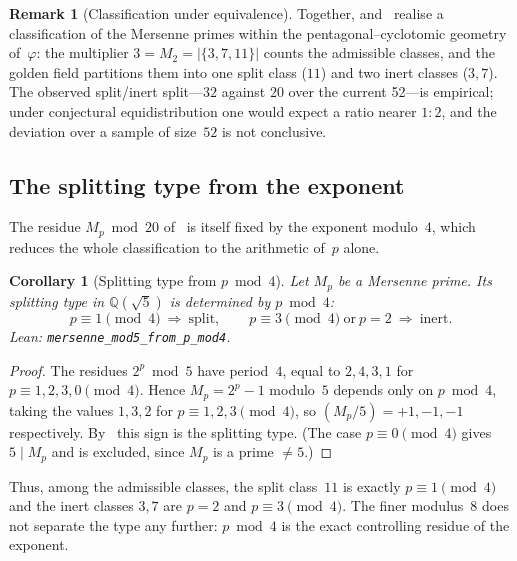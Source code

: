 \documentclass[11pt]{amsart}
\newtheorem{Corollary}[Theorem]{Corollary}
\theoremstyle{definition}
\newtheorem{Remark}[Theorem]{Remark}
\newcommand{\golden}{\varphi}
\newcommand{\Mp}{M_{p}}
\newcommand{\lean}[1]{\texttt{#1}}
\begin{document}
\begin{Remark}[Classification under equivalence]\label{rem:classification}
Together,  and~
realise a classification of the Mersenne primes within the
pentagonal--cyclotomic geometry of~$\golden$: the multiplier
$3=M_{2}=|\{3,7,11\}|$ counts the admissible classes, and the golden
field partitions them into one split class ($11$) and two inert classes
($3,7$).  The observed split/inert split---$32$ against $20$ over the
current 52---is empirical; under conjectural equidistribution one would
expect a ratio nearer $1:2$, and the deviation over a sample of size~$52$
is not conclusive.
\end{Remark}


\subsection{The splitting type from the exponent}
\label{ssec:fib-exponent}

The residue $\Mp\bmod20$ of~ is itself fixed by the
exponent modulo~$4$, which reduces the whole classification to the
arithmetic of~$p$ alone.

\begin{Corollary}[Splitting type from $p\bmod4$]\label{cor:split-from-p}
Let $\Mp$ be a Mersenne prime.  Its splitting type in $\mathbb{Q}(\sqrt5)$
is determined by $p\bmod4$:
\[
  p\equiv1\!\!\pmod4\ \Rightarrow\ \text{split},
  \qquad
  p\equiv3\!\!\pmod4\ \text{or}\ p=2\ \Rightarrow\ \text{inert}.
\]
  \emph{Lean:} \lean{mersenne\_mod5\_from\_p\_mod4}.
\end{Corollary}

\begin{proof}
The residues $2^{p}\bmod5$ have period~$4$, equal to $2,4,3,1$ for
$p\equiv1,2,3,0\pmod4$.  Hence $\Mp=2^{p}-1$ modulo~$5$ depends only on
$p\bmod4$, taking the values $1,3,2$ for $p\equiv1,2,3\pmod4$, so
$(\Mp/5)=+1,-1,-1$ respectively.  By~ this sign is
the splitting type.  (The case $p\equiv0\pmod4$ gives $5\mid\Mp$ and is
excluded, since $\Mp$ is a prime $\neq5$.)
\end{proof}

Thus, among the admissible classes, the split class~$11$ is exactly
$p\equiv1\pmod4$ and the inert classes $3,7$ are $p=2$ and $p\equiv3\pmod4$.
The finer modulus~$8$ does not separate the type any further: $p\bmod4$ is
the exact controlling residue of the exponent.
\end{document}
